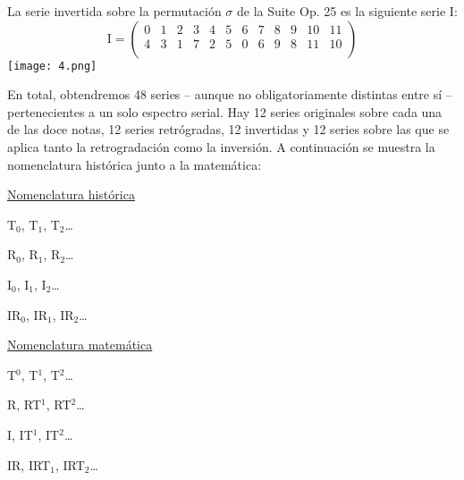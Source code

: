 		La serie invertida sobre la permutación $\sigma$ de la Suite Op. 25 es la siguiente serie I:
		$$
		\text{I}=\left(\begin{matrix}0&1&2&3&4&5&6&7&8&9&10&11\\4&3&1&7&2&5&0&6&9&8&11&10\\\end{matrix}\right)
		$$		
		\texttt{[image: 4.png]}
				
		En total, obtendremos 48 series -- aunque no obligatoriamente distintas entre sí -- pertenecientes a un solo espectro serial. Hay 12 series originales sobre cada una de las doce notas, 12 series retrógradas, 12 invertidas y 12 series sobre las que se aplica tanto la retrogradación como la inversión. A continuación se muestra la nomenclatura histórica junto a la matemática:
		
		\begin{center}
		\begin{multicols}{2}
			\underline{Nomenclatura histórica}
			
			T$_0$, T$_1$, T$_2$\ldots
			
			R$_0$, R$_1$, R$_2$\ldots
			
			I$_0$, I$_1$, I$_2$\ldots
			
			IR$_0$, IR$_1$, IR$_2$\ldots
			
			\underline{Nomenclatura matemática}
			
			T$^0$, T$^1$, T$^2$\ldots
			
			R, RT$^1$, RT$^2$\ldots
			
			I, IT$^1$, IT$^2$\ldots
			
			IR, IRT$_1$, IRT$_2$\ldots
		\end{multicols}
		\end{center}